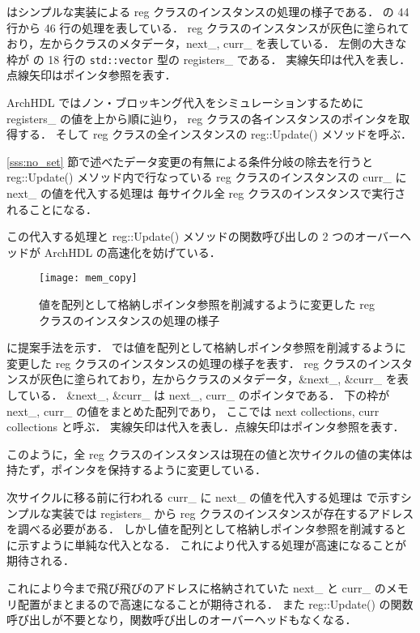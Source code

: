  はシンプルな実装による reg クラスのインスタンスの処理の様子である．
 の 44 行から 46 行の処理を表している．
reg クラスのインスタンスが灰色に塗られており，左からクラスのメタデータ，next\_, curr\_ を表している．
左側の大きな枠が の 18 行の \verb`std::vector` 型の registers\_ である．
実線矢印は代入を表し．点線矢印はポインタ参照を表す．

ArchHDL ではノン・ブロッキング代入をシミュレーションするために registers\_ の値を上から順に辿り，
reg クラスの各インスタンスのポインタを取得する．
そして reg クラスの全インスタンスの reg::Update() メソッドを呼ぶ．

\ref{sss:no_set} 節で述べたデータ変更の有無による条件分岐の除去を行うと reg::Update() メソッド内で行なっている
reg クラスのインスタンスの curr\_ に next\_ の値を代入する処理は
毎サイクル全 reg クラスのインスタンスで実行されることになる．

この代入する処理と reg::Update() メソッドの関数呼び出しの 2 つのオーバーヘッドが ArchHDL の高速化を妨げている．

\begin{figure}[t]
 \centering
 \texttt{[image: mem\_copy]}
 \caption{値を配列として格納しポインタ参照を削減するように変更した reg クラスのインスタンスの処理の様子}
 \label{fig:mem_copy}
\end{figure}

 に提案手法を示す．
 では値を配列として格納しポインタ参照を削減するように変更した reg クラスのインスタンスの処理の様子を表す．
reg クラスのインスタンスが灰色に塗られており，左からクラスのメタデータ，\&next\_, \&curr\_ を表している．
\&next\_, \&curr\_ は next\_, curr\_ のポインタである．
下の枠が next\_, curr\_ の値をまとめた配列であり，
ここでは next collections, curr collections と呼ぶ．
実線矢印は代入を表し．点線矢印はポインタ参照を表す．

このように，全 reg クラスのインスタンスは現在の値と次サイクルの値の実体は持たず，ポインタを保持するように変更している．

次サイクルに移る前に行われる curr\_ に next\_ の値を代入する処理は
 で示すシンプルな実装では registers\_ から reg クラスのインスタンスが存在するアドレスを調べる必要がある．
しかし値を配列として格納しポインタ参照を削減すると  に示すように単純な代入となる．
これにより代入する処理が高速になることが期待される．

これにより今まで飛び飛びのアドレスに格納されていた next\_ と curr\_ のメモリ配置がまとまるので高速になることが期待される．
また reg::Update() の関数呼び出しが不要となり，関数呼び出しのオーバーヘッドもなくなる．


